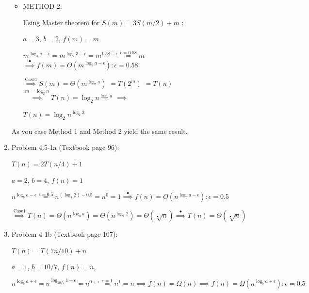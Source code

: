 \documentclass[11pt]{article}
\begin{document}
\begin{enumerate}
\begin{itemize}
    \end{itemize}	
	

	\begin{itemize}
	    \item METHOD 2:
	    
	    Using Master theorem for $ S(m) = 3S(m/2) + m$ :
	    
    	$a=3$, $b=2$, $f(m)=m$
    	
    	$m^{\log_b{a}-\epsilon} \overset{}{=} m^{\log_{2}{3}-\epsilon}=m^{1.58-\epsilon}\overset{\epsilon=0.58}{=}m$  
	    $\overset{\mathrm{•}}{\implies} f(m)=O(m^{\log_b{a}-\epsilon}):\epsilon=0.58$
	    
	    $\overset{\mathrm{Case 1}}{\implies} S(m)=\Theta(m^{\log_b{a}})$	
	    $\overset{\mathrm{}}{=}T(2^m)$
	    $\overset{\mathrm{}}{=}T(n)$
	    $\overset{m=\log_2{n}}{\implies}T(n)=\log_2{n}^{\log_b{a}}$	
	    $\overset{}{\implies}$
	    
	    $T(n)=\log_2{n}^{\log_2{3}}$	
  		 

    \end{itemize}
    
    As you case Method 1 and Method 2 yield the same result.
	
	
	
	

	
	
	 
\pagebreak
	
\item Problem 4.5-1a (Textbook page 96):
	
	$T(n)=2T(n/4)+1$
	
	$a=2$, $b=4$, $f(n)=1$
	
	$n^{\log_b{a}-\epsilon} \overset{\epsilon=0.5}{=} n^{(\log_4{2})-0.5}=n^{0}=1
	\overset{\mathrm{•}}{\implies} f(n)=O(n^{\log_b{a}-\epsilon}):\epsilon=0.5$
	
	$\overset{\mathrm{Case 1}}{\implies} T(n)=\Theta(n^{\log_b{a}})=\Theta(n^{\log_4{2}})=\Theta(\sqrt[•]{n}) 
	\overset{\mathrm{•}}{\implies} T(n)=\Theta(\sqrt[•]{n}) $ 







\item Problem 4-1b (Textbook page 107):

	$T(n)=T(7n/10)+n$

	$a=1$, $b=10/7$, $f(n)=n$, 
	
	$n^{\log_b{a}+\epsilon} \overset{}{=} n^{\log_{10/7}{1}+\epsilon}=n^{0+\epsilon}\overset{\epsilon = 1}{=}n^{1}=n  
	\overset{}{\implies} f(n)=\Omega(n)
	\overset{}{\implies} f(n)=\Omega(n^{\log_b{a}+\epsilon}):\epsilon=0.5$
	

\end{enumerate}
\end{document}
